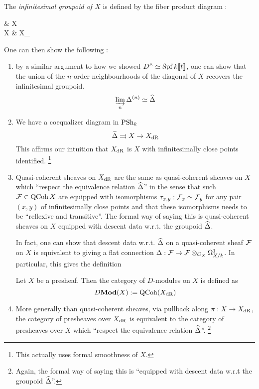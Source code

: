 \documentclass[./main.tex]{subfiles}
\begin{document}
\begin{dfn}
  
  The \emph{infinitesimal groupoid of $X$} is defined by
  the fiber product diagram : 
  \begin{cd}
    {\widehat{\De}} & X \\
    X & {X_{\DR}}
    \arrow[from=1-1, to=2-1]
    \arrow[from=2-1, to=2-2]
    \arrow[from=1-1, to=1-2]
    \arrow[from=1-2, to=2-2]
    \arrow["\lrcorner"{anchor=center, pos=0.125}, draw=none, from=1-1, to=2-2]
  \end{cd}
\end{dfn}
One can then show the following : 
\begin{enumerate}
  \item by a similar argument to how we showed $D^\wedge \simeq \operatorname{Spf} k\llbracket t \rrbracket$,
  one can show that the union of the $n$-order neighbourhoods of 
  the diagonal of $X$ recovers the infinitesimal groupoid.\[
    \varinjlim_{n} \Delta^{(n)} \simeq \widehat{\Delta}
  \]
  \item We have a coequalizer diagram in $\operatorname{PSh}_k$\[
    \widehat{\Delta} \rightrightarrows X \to X_{\mathrm{dR}}
  \]
  This affirms our intuition that $X_{\mathrm{dR}}$ is $X$
  with infinitesimally close points identified.
  \footnote{
    This actually uses formal smoothness of $X$.
  }
  \item Quasi-coherent sheaves on $X_{\mathrm{dR}}$ are the same as
  quasi-coherent sheaves on $X$ which ``respect the equivalence relation
  $\widehat{\Delta}$'' in the sense that
  such $\mathcal{F} \in \operatorname{QCoh} X$ are equipped with
  isomorphisms $\tau_{x,y} : \mathcal{F}_x \simeq \mathcal{F}_y$
  for any pair $(x,y)$ of infinitesimally close points
  and that these isomorphisms needs to be
  ``reflexive and transitive''.
  The formal way of saying this is quasi-coherent sheaves on $X$
  equipped with descent data w.r.t. the groupoid $\widehat{\Delta}$.
  
  In fact, one can show that descent data w.r.t. $\widehat{\Delta}$ on
  a quasi-coherent sheaf $\mathcal{F}$ on $X$
  is equivalent to giving a flat connection 
  $\Delta : \mathcal{F} \to \mathcal{F} \otimes_{\mathcal{O}_X} \Omega^1_{X/k}$.
  In particular, this gives the definition 
  \begin{dfn}
    
    Let $X$ be a presheaf.
    Then the category of $D$-modules on $X$ is defined as
    \[
      D\mathbf{Mod}(X) := \operatorname{QCoh}(X_{\mathrm{dR}})
    \]
  \end{dfn}
  \item More generally than quasi-coherent sheaves,
  via pullback along $\pi : X \to X_{\mathrm{dR}}$,
  the category of presheaves over $X_{\mathrm{dR}}$ is equivalent to
  the category of presheaves over $X$ 
  which ``respect the equivalence relation $\widehat{\Delta}$''.
  \footnote{
    Again, the formal way of saying this is 
    ``equipped with descent data w.r.t the groupoid $\widehat{\Delta}$''.
  }
\end{enumerate}
\end{document}
